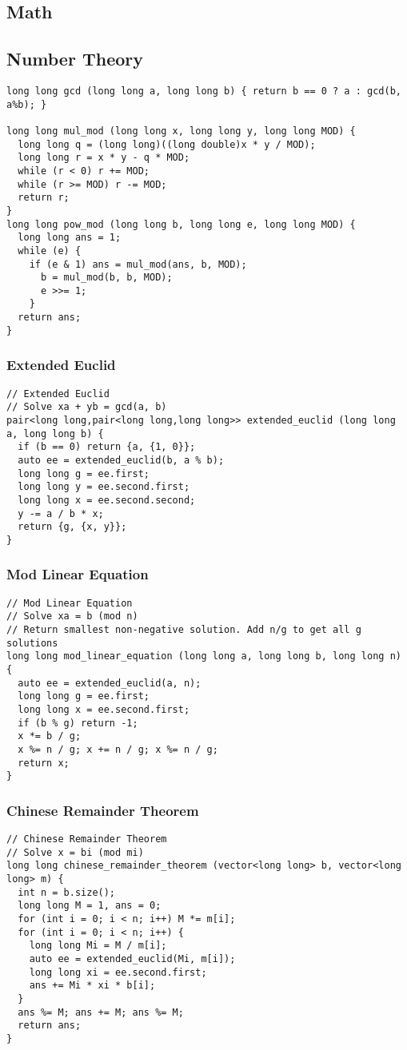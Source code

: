 \documentclass[10pt,landscape]{article}
\begin{document}
\begin{multicols}{2}
\section{Math}
\subsection{Number Theory}
\begin{lstlisting}
long long gcd (long long a, long long b) { return b == 0 ? a : gcd(b, a%b); }

long long mul_mod (long long x, long long y, long long MOD) {
  long long q = (long long)((long double)x * y / MOD);
  long long r = x * y - q * MOD;
  while (r < 0) r += MOD;
  while (r >= MOD) r -= MOD;
  return r;
}
long long pow_mod (long long b, long long e, long long MOD) {
  long long ans = 1;
  while (e) {
    if (e & 1) ans = mul_mod(ans, b, MOD);
      b = mul_mod(b, b, MOD);
      e >>= 1;
    }
  return ans;
}
\end{lstlisting}
\subsubsection{Extended Euclid}
\begin{lstlisting}
// Extended Euclid
// Solve xa + yb = gcd(a, b)
pair<long long,pair<long long,long long>> extended_euclid (long long a, long long b) {
  if (b == 0) return {a, {1, 0}};
  auto ee = extended_euclid(b, a % b);
  long long g = ee.first;
  long long y = ee.second.first;
  long long x = ee.second.second;
  y -= a / b * x;
  return {g, {x, y}};
}
\end{lstlisting}
\subsubsection{Mod Linear Equation}
\begin{lstlisting}
// Mod Linear Equation
// Solve xa = b (mod n)
// Return smallest non-negative solution. Add n/g to get all g solutions
long long mod_linear_equation (long long a, long long b, long long n) {
  auto ee = extended_euclid(a, n);
  long long g = ee.first;
  long long x = ee.second.first;
  if (b % g) return -1;
  x *= b / g;
  x %= n / g; x += n / g; x %= n / g;
  return x;
}
\end{lstlisting}
\subsubsection{Chinese Remainder Theorem}
\begin{lstlisting}
// Chinese Remainder Theorem
// Solve x = bi (mod mi)
long long chinese_remainder_theorem (vector<long long> b, vector<long long> m) {
  int n = b.size();
  long long M = 1, ans = 0;
  for (int i = 0; i < n; i++) M *= m[i];
  for (int i = 0; i < n; i++) {
    long long Mi = M / m[i];
    auto ee = extended_euclid(Mi, m[i]);
    long long xi = ee.second.first;
    ans += Mi * xi * b[i];
  }
  ans %= M; ans += M; ans %= M;
  return ans;
}
\end{lstlisting}

\end{multicols}
\end{document}

